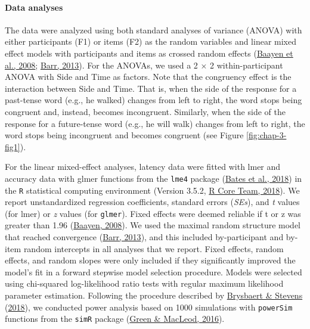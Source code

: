 \documentclass[
  a4paper,12pt,twoside,onecolumn,openright,final,oldfontcommands]{memoir}
\begin{document}
\hypertarget{data-analyses}{%
\paragraph{Data analyses}\label{data-analyses}}

The data were analyzed using both standard analyses of variance (ANOVA) with either participants (F1) or items (F2) as the random variables and linear mixed effect models with participants and items as crossed random effects (\protect\hyperlink{ref-baayen_mixed-effects_2008}{Baayen et al., 2008}; \protect\hyperlink{ref-barr_random_2013}{Barr, 2013}). For the ANOVAs, we used a 2 × 2 within-participant ANOVA with Side and Time as factors. Note that the congruency effect is the interaction between Side and Time. That is, when the side of the response for a past-tense word (e.g., he walked) changes from left to right, the word stops being congruent and, instead, becomes incongruent. Similarly, when the side of the response for a future-tense word (e.g., he will walk) changes from left to right, the word stops being incongruent and becomes congruent (see Figure \ref{fig:chap-3-fig1}).

For the linear mixed-effect analyses, latency data were fitted with lmer and accuracy data with glmer functions from the \texttt{lme4} package (\protect\hyperlink{ref-R-lme4}{Bates et al., 2018}) in the \texttt{R} statistical computing environment (Version 3.5.2, \protect\hyperlink{ref-R-base}{R Core Team, 2018}). We report unstandardized regression coefficients, standard errors (\emph{SEs}), and \emph{t} values (for lmer) or \emph{z} values (for \texttt{glmer}). Fixed effects were deemed reliable if \textbar t\textbar{} or \textbar z\textbar{} was greater than 1.96 (\protect\hyperlink{ref-baayen_analyzing_2008}{Baayen, 2008}). We used the maximal random structure model that reached convergence (\protect\hyperlink{ref-barr_random_2013}{Barr, 2013}), and this included by-participant and by-item random intercepts in all analyses that we report. Fixed effects, random effects, and random slopes were only included if they significantly improved the model's fit in a forward stepwise model selection procedure. Models were selected using chi-squared log-likelihood ratio tests with regular maximum likelihood parameter estimation. Following the procedure described by \protect\hyperlink{ref-brysbaert_power_2018}{Brysbaert \& Stevens} (\protect\hyperlink{ref-brysbaert_power_2018}{2018}), we conducted power analysis based on 1000 simulations with \texttt{powerSim} functions from the \texttt{simR} package (\protect\hyperlink{ref-green_simr_2016}{Green \& MacLeod, 2016}).
\end{document}
